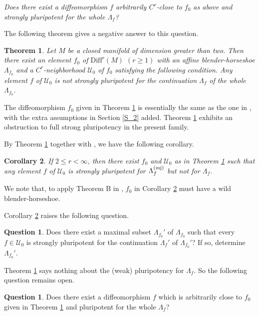 \documentclass{amsart}
\theoremstyle{plain}
\newtheorem{mtheorem}{Theorem}
\newtheorem{mcorollary}[mtheorem]{Corollary}
\theoremstyle{definition}
\newtheorem{question}[thm]{Question}
\theoremstyle{remark}
\numberwithin{equation}{section}
\begin{document}
\medskip
\emph{
Does there exist a diffeomorphism $f$ arbitrarily $C^r$-close to $f_0$ 
as  above and strongly pluripotent for the whole $\Lambda_{f}$?}
\medskip


The following theorem gives a negative answer to this question.


\begin{mtheorem}\label{thm_A}
Let $M$ be a closed manifold of dimension greater than two. 
Then there exist an element $f_0$ of $\mathrm{Diff}^r(M)$ $(r\geq 1)$ with an affine blender-horseshoe $\Lambda_{f_0}$ and a $C^r$-neighborhood $\mathcal{U}_0$ of $f_0$ satisfying the following condition. 
Any element $f$ of  $\mathcal{U}_0$ is not strongly pluripotent 
for the continuation $\Lambda_f$ of the whole $\Lambda_{f_0}$.
\end{mtheorem}

The diffeomorphism $f_0$ given in Theorem \ref{thm_A} is essentially the same as the one in \cite[Theorem~B]{KNS}, with the extra assumptions in Section \ref{S_2} added.
Theorem \ref{thm_A} exhibits an obstruction to full strong pluripotency in the present family.



By Theorem \ref{thm_A} together with \cite[Theorem B]{KNS}, we have the following corollary.

\begin{mcorollary}\label{cor_B}
If $2\leq r<\infty$, then there exist $f_0$ and $\mathcal{U}_0$ as in Theorem \ref{thm_A} 
such that  
any element $f$ of $\mathcal{U}_0$ is strongly pluripotent for $\Lambda_f^{({\rm mj})}$ but not 
for $\Lambda_f$.
\end{mcorollary}

We note that, to apply Theorem B in \cite{KNS}, $f_0$ in Corollary \ref{cor_B} must have a wild blender-horseshoe.

Corollary \ref{cor_B} raises the following question.


\begin{question}
Does there exist a maximal subset $\Lambda_{f_0}'$ of $\Lambda_{f_0}$ such that
every $f \in \mathcal{U}_0$ is strongly pluripotent for the continuation
$\Lambda_f'$ of $\Lambda_{f_0}'$?
If so, determine $\Lambda_{f_0}'$.
\end{question}



Theorem \ref{thm_A} says nothing about the (weak) pluripotency for $\Lambda_f$. 
So the following question remains open.


\begin{question}
Does there exist a diffeomorphism $f$ which is arbitrarily close to $f_0$ given in Theorem \ref{thm_A} 
and pluripotent for the whole $\Lambda_f$?
\end{question}
\end{document}
